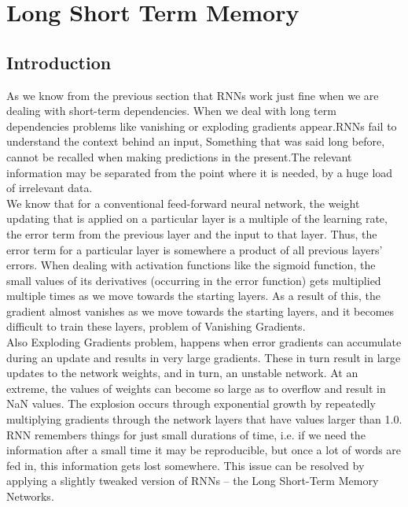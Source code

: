 \section{Long Short Term Memory}
\label{chap:Long Short Term Memory}

\subsection{Introduction}
As we know from the previous section that RNNs work just fine when we are dealing with short-term dependencies.
When we deal with long term dependencies problems like vanishing or exploding gradients appear.RNNs fail to understand the context behind an input, Something that was said long before, cannot be recalled when making predictions in the present.The relevant information may be separated from the point where it is needed, by a huge load of irrelevant data.\\
We know that for a conventional feed-forward neural network, the weight updating that is applied on a particular layer is a multiple of the learning rate, the error term from the previous layer and the input to that layer. Thus, the error term for a particular layer is somewhere a product of all previous layers’ errors. When dealing with activation functions like the sigmoid function, the small values of its derivatives (occurring in the error function) gets multiplied multiple times as we move towards the starting layers. As a result of this, the gradient almost vanishes as we move towards the starting layers, and it becomes difficult to train these layers, problem of Vanishing Gradients.\\
Also Exploding Gradients problem, happens when error gradients can accumulate during an update and results in very large gradients. These in turn result in large updates to the network weights, and in turn, an unstable network. At an extreme, the values of weights can become so large as to overflow and result in NaN values. The explosion occurs through exponential growth by repeatedly multiplying gradients through the network layers that have values larger than 1.0.\\
RNN remembers things for just small durations of time, i.e. if we need the information after a small time it may be reproducible, but once a lot of words are fed in, this information gets lost somewhere. This issue can be resolved by applying a slightly tweaked version of RNNs – the Long Short-Term Memory Networks.\cite{web005}

